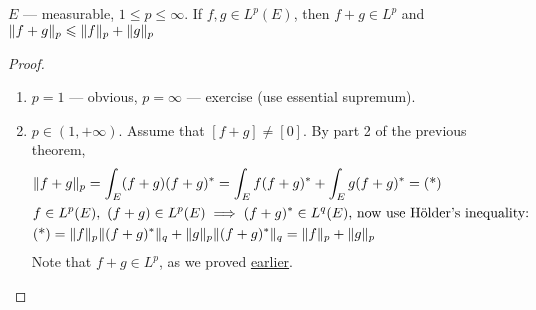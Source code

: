 \begin{theorem}
    $E$ --- measurable, $1 \le p \le \infty$.
    If $f, g \in L^p(E)$, then 
    $f + g \in L^p$ and 
    $\lVert f + g\rVert_p \leqslant \lVert f\rVert_p + \lVert g\rVert_p$
\end{theorem}
\begin{proof}
    \mbox{}
    \begin{enumerate}[label={Case \arabic*.}]
        \item {
            $p = 1$ --- obvious, $p = \infty$ --- exercise (use essential supremum).
        }
        \item {
            $p \in (1, +\infty)$. Assume that $[f + g] \ne [0]$.
            By part 2 of the previous theorem,
            \begin{align*}
                &\lVert f + g\rVert_p = \int_E (f + g)(f + g)^* = 
                \int_E f (f + g)^* + \int_E g(f+g)^* = \text{(*)}
                \\&
                f \in L^p(E),\ (f+g) \in L^p(E) \implies (f+g)^* \in L^q(E)
                \text{, now use Hölder's inequality:}
                \\&
                \text{(*)} = \lVert f\rVert_p \lVert(f+g)^*\rVert_q +
                \lVert g\rVert_p \lVert(f+g)^*\rVert_q = \lVert f\rVert_p + \lVert g\rVert_p
            \end{align*}
            Note that $f + g \in L^p$, as we proved
            \hyperref[prop:sumIsInLp]{earlier}.
        }
    \end{enumerate}
\end{proof}
